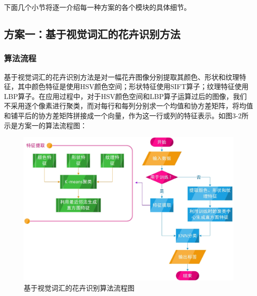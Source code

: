 \documentclass[supercite]{HustGraduPaper}
\begin{document}
\begin{sloppypar}
  下面几个小节将逐一介绍每一种方案的各个模块的具体细节。
  \subsection{方案一：基于视觉词汇的花卉识别方法}
  \subsubsection{算法流程}
  基于视觉词汇的花卉识别方法是对一幅花卉图像分别提取其颜色、形状和纹理特征，其中颜色特征是使用HSV颜色空间；形状特征使用SIFT算子；纹理特征使用LBP算子。在应用过程中，对于HSV颜色空间和LBP算子运算过后的图像，我们不采用逐个像素进行聚类，而对每行和每列分别求一个均值和协方差矩阵，将均值和铺平后的协方差矩阵拼接成一个向量，作为这一行或列的特征表示。如图3-2所示是方案一的算法流程图：\begin{figure}[H]
    \setlength{\abovecaptionskip}{0.2cm}
    \setlength{\belowcaptionskip}{-0.cm}
      \centering%
      \includegraphics[scale=0.62]{22.jpg}
      \caption{基于视觉词汇的花卉识别算法流程图}
    \end{figure}

\end{sloppypar}
\end{document}

